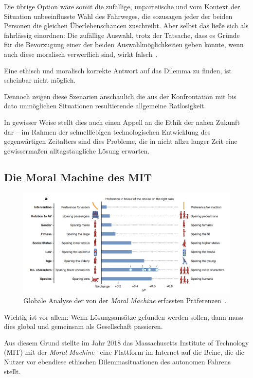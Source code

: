 \documentclass[twocolumn, german]{tum-article}
\begin{document}
Die übrige Option wäre somit die zufällige, unparteiische und vom Kontext der Situation unbeeinflusste Wahl des Fahrweges, die sozusagen jeder der beiden Personen die gleichen Überlebenschancen zuschreibt.
Aber selbst das ließe sich als fahrlässig einordnen:
Die zufällige Auswahl, trotz der Tatsache, dass es Gründe für die Bevorzugung einer der beiden Auswahlmöglichkeiten geben könnte, wenn auch diese moralisch verwerflich sind, wirkt falsch~\cite[S. 71]{maurer-autonomous}.

Eine ethisch und moralisch korrekte Antwort auf das Dilemma zu finden, ist scheinbar nicht möglich.

Dennoch zeigen diese Szenarien anschaulich die aus der Konfrontation mit bis dato unmöglichen Situationen resultierende allgemeine Ratlosigkeit.

In gewisser Weise stellt dies auch einen Appell an die Ethik der nahen Zukunft dar -- im Rahmen der schnelllebigen technologischen Entwicklung des gegenwärtigen Zeitalters sind dies Probleme, die in nicht allzu langer Zeit eine gewissermaßen alltagstaugliche Lösung erwarten.


\subsection{Die Moral Machine des MIT}
\begin{figure}
	\includegraphics[width=\linewidth]{media/global-prefs}
	\caption{Globale Analyse der von der \emph{Moral Machine} erfassten Präferenzen~\cite[S. 61]{moral-machine}.}
	\label{fig:moral-preferences}
\end{figure}

Wichtig ist vor allem: Wenn Lösungsansätze gefunden werden sollen, dann muss dies global und gemeinsam als Gesellschaft passieren.

Aus diesem Grund stellte im Jahr 2018 das Massachusetts Institute of Technology (MIT) mit der \emph{Moral Machine}~\cite{moral-machine-web} eine Plattform im Internet auf die Beine, die die Nutzer vor ebendiese ethischen Dilemmasituationen des autonomen Fahrens stellt.
\end{document}
